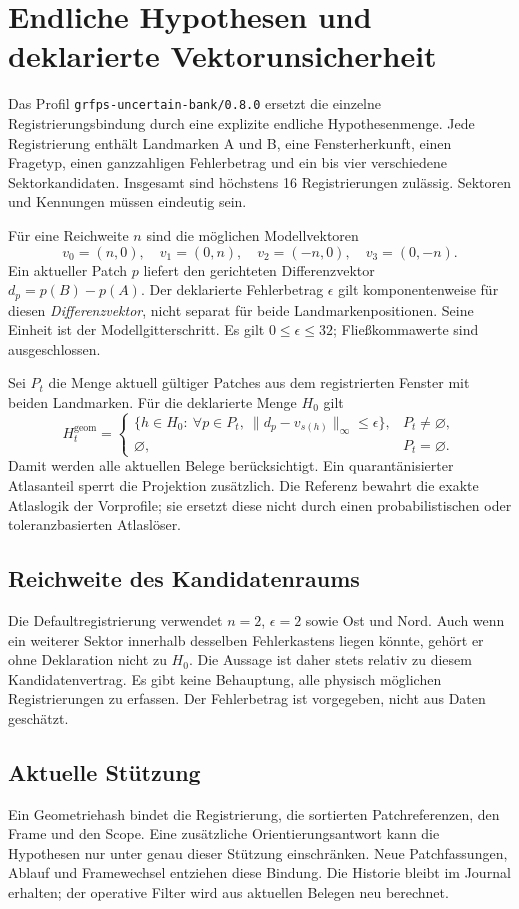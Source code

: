 \documentclass[11pt,a4paper]{article}
\newcommand{\nextsection}[2]{\clearpage{\color{accent}\small\textsf{#1}}\section{#2}}
\begin{document}
\nextsection{46 / MENGENWERTIGE REGISTRIERUNG}{Endliche Hypothesen und deklarierte Vektorunsicherheit}
Das Profil \texttt{grfps-uncertain-bank/0.8.0} ersetzt die einzelne
Registrierungsbindung durch eine explizite endliche Hypothesenmenge.
Jede Registrierung enthält Landmarken A und B, eine Fensterherkunft,
einen Fragetyp, einen ganzzahligen Fehlerbetrag und ein bis vier
verschiedene Sektorkandidaten. Insgesamt sind höchstens 16
Registrierungen zulässig. Sektoren und Kennungen müssen eindeutig sein.

Für eine Reichweite $n$ sind die möglichen Modellvektoren
\[
 v_0=(n,0),\quad v_1=(0,n),\quad v_2=(-n,0),\quad v_3=(0,-n).
\]
Ein aktueller Patch $p$ liefert den gerichteten Differenzvektor
$d_p=p(B)-p(A)$. Der deklarierte Fehlerbetrag $\epsilon$ gilt
komponentenweise für diesen \emph{Differenzvektor}, nicht separat
für beide Landmarkenpositionen. Seine Einheit ist der Modellgitterschritt.
Es gilt $0\leq\epsilon\leq32$; Fließkommawerte sind ausgeschlossen.

Sei $P_t$ die Menge aktuell gültiger Patches aus dem registrierten
Fenster mit beiden Landmarken. Für die deklarierte Menge $H_0$ gilt
\[
 H_t^{\mathrm{geom}}=
 \begin{cases}
 \{h\in H_0:\ \forall p\in P_t,\ \|d_p-v_{s(h)}\|_\infty\leq\epsilon\},
   &P_t\ne\varnothing,\\
 \varnothing,&P_t=\varnothing.
 \end{cases}
\]
Damit werden alle aktuellen Belege berücksichtigt. Ein quarantänisierter
Atlasanteil sperrt die Projektion zusätzlich. Die Referenz bewahrt die
exakte Atlaslogik der Vorprofile; sie ersetzt diese nicht durch einen
probabilistischen oder toleranzbasierten Atlaslöser.

\subsection{Reichweite des Kandidatenraums}
Die Defaultregistrierung verwendet $n=2$, $\epsilon=2$ sowie
Ost und Nord. Auch wenn ein weiterer Sektor innerhalb desselben
Fehlerkastens liegen könnte, gehört er ohne Deklaration nicht zu
$H_0$. Die Aussage ist daher stets relativ zu diesem Kandidatenvertrag.
Es gibt keine Behauptung, alle physisch möglichen Registrierungen
zu erfassen. Der Fehlerbetrag ist vorgegeben, nicht aus Daten geschätzt.

\subsection{Aktuelle Stützung}
Ein Geometriehash bindet die Registrierung, die sortierten
Patchreferenzen, den Frame und den Scope. Eine zusätzliche
Orientierungsantwort kann die Hypothesen nur unter genau dieser
Stützung einschränken. Neue Patchfassungen, Ablauf und Framewechsel
entziehen diese Bindung. Die Historie bleibt im Journal erhalten;
der operative Filter wird aus aktuellen Belegen neu berechnet.
\end{document}

